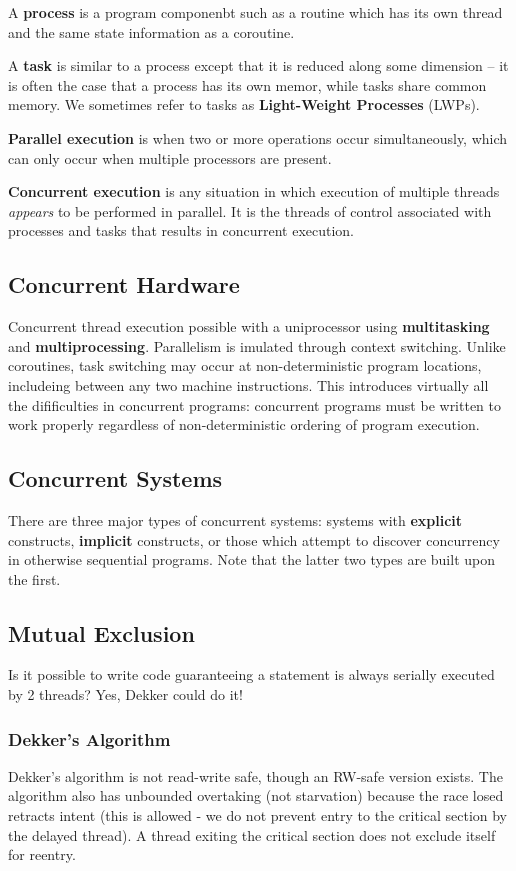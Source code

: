 \documentclass[12pt]{article}
\begin{document}
A {\bf process} is a program componenbt such as a routine which has its own thread and the same state information as a coroutine.

A {\bf task} is similar to a process except that it is reduced along some dimension -- it is often the case that a process has its own memor, while tasks share common memory. We sometimes refer to tasks as {\bf Light-Weight Processes} (LWPs).

{\bf Parallel execution} is when two or more operations occur simultaneously, which can only occur when multiple processors are present.

{\bf Concurrent execution} is any situation in which execution of multiple threads \textit{appears} to be performed in parallel. It is the threads of control associated with processes and tasks that results in concurrent execution.

\subsection{Concurrent Hardware}
Concurrent thread execution possible with a uniprocessor using {\bf multitasking} and {\bf multiprocessing}. Parallelism is imulated through context switching. Unlike coroutines, task switching may occur at non-deterministic program locations, includeing between any two machine instructions. This introduces virtually all the difificulties in concurrent programs: concurrent programs must be written to work properly regardless of non-deterministic ordering of program execution.

\subsection{Concurrent Systems}
There are three major types of concurrent systems: systems with {\bf explicit} constructs, {\bf implicit} constructs, or those which attempt to discover concurrency in otherwise sequential programs. Note that the latter two types are built upon the first.


\subsection{Mutual Exclusion}
Is it possible to write code guaranteeing a statement is always serially executed by 2 threads? Yes, Dekker could do it!

\subsubsection{Dekker's Algorithm}
Dekker's algorithm is not read-write safe, though an RW-safe version exists. The algorithm also has unbounded overtaking (not starvation) because the race losed retracts intent (this is allowed - we do not prevent entry to the critical section by the delayed thread). A thread exiting the critical section does not exclude itself for reentry.
\end{document}
